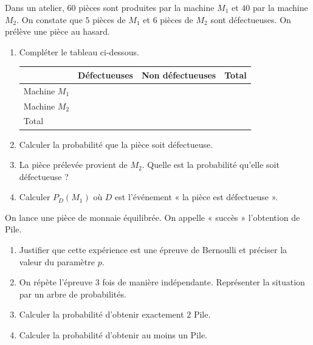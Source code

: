 \documentclass[11pt]{article}
\begin{document}
\begin{exercice}
Dans un atelier, $60$ pièces sont produites par la machine $M_1$ et $40$ par la machine $M_2$. On constate que $5$ pièces de $M_1$ et $6$ pièces de $M_2$ sont défectueuses. On prélève une pièce au hasard.
\begin{enumerate}
\item Compléter le tableau ci-dessous.
\begin{center}
\begin{tabular}{|l|c|c|c|}
\hline
 & Défectueuses & Non défectueuses & Total \\
\hline
Machine $M_1$ & & & \\
\hline
Machine $M_2$ & & & \\
\hline
Total & & & \\
\hline
\end{tabular}
\end{center}
\item Calculer la probabilité que la pièce soit défectueuse.
\item La pièce prélevée provient de $M_2$. Quelle est la probabilité qu'elle soit défectueuse ?
\item Calculer $P_{D}(M_1)$ où $D$ est l'événement « la pièce est défectueuse ».
\end{enumerate}
\end{exercice}

\begin{exercice}
On lance une pièce de monnaie équilibrée. On appelle « succès » l'obtention de Pile.
\begin{enumerate}
\item Justifier que cette expérience est une épreuve de Bernoulli et préciser la valeur du paramètre $p$.
\item On répète l'épreuve $3$ fois de manière indépendante. Représenter la situation par un arbre de probabilités.
\item Calculer la probabilité d'obtenir exactement $2$ Pile.
\item Calculer la probabilité d'obtenir au moins un Pile.
\end{enumerate}
\end{exercice}
\end{document}
